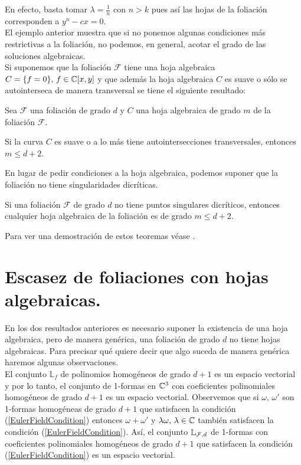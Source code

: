 En efecto, basta tomar $\lambda = \tfrac{1}{n}$ con $n>k$ pues así las hojas de la foliación corresponden a $y^n - cx = 0$.
\\

El ejemplo anterior muestra que si no ponemos algunas condiciones más restrictivas a la foliación, no podemos, en general, acotar el grado de las soluciones algebraicas.\\

Si suponemos que la foliación $\mathcal{F}$ tiene una hoja algebraica $C=\{ f=0\}, \, f\in\mathbb{C}[x,y]$ y que además la hoja algebraica $C$ es suave o sólo se autointerseca de manera transversal se tiene el siguiente resultado:\\

\begin{Teorema}
\label{Teo:CotaHojaSuave}
Sea $\mathcal{F}$ una foliación de grado $d$ y $C$ una hoja algebraica de grado $m$ de la foliación $\mathcal{F}$.

Si la curva $C$ es suave o a lo más tiene autointersecciones transversales, entonces $m\leq d+2$.
\end{Teorema}

En lugar de pedir condiciones a la hoja algebraica, podemos suponer que la foliación no tiene singularidades dicríticas.

\begin{Teorema}
\label{Teo:CotaSingularidadesNoDicriticas}
Si una foliación $\mathcal{F}$ de grado $d$ no tiene puntos singulares dicríticos, entonces cualquier hoja algebraica de la foliación es de grado $m\leq d+2$.
\end{Teorema}

Para ver una demostración de estos teoremas véase \cite[pp.~479,480]{IlyaYako}.

\section{Escasez de foliaciones con hojas algebraicas.}

En los dos resultados anteriores es necesario suponer la existencia de una hoja algebraica, pero de manera genérica, una foliación de grado $d$ no tiene hojas algebraicas. Para precisar qué quiere decir que algo suceda de manera genérica haremos algunas observaciones.\\

El conjunto $\mathbb{L}_{f}$ de polinomios homogéneos de grado $d+1$ es un espacio vectorial y por lo tanto, el conjunto de 1-formas en $\mathbb{C}^{3}$ con coeficientes polinomiales homogéneos de grado $d+1$ es un espacio vectorial. Observemos que si $\omega, \, \omega'$ son 1-formas homogéneas de grado $d+1$ que satisfacen la condición (\ref{EulerFieldCondition}) entonces $\omega + \omega'$ y $\lambda\omega,\, \lambda\in\mathbb{C}$ también satisfacen la condición (\ref{EulerFieldCondition}). Así, el conjunto $\mathbb{L}_{\mathcal{F},d}$ de 1-formas  con coeficientes polinomiales homogéneos  de grado $d+1$ que satisfacen la condición (\ref{EulerFieldCondition}) es un espacio vectorial.\\

